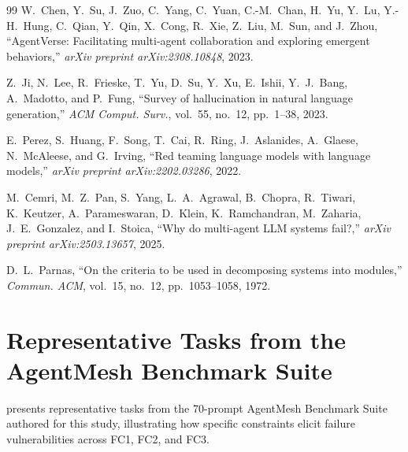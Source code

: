 \documentclass[conference]{IEEEtran}
\newcommand{\fc}[1]{\textsf{FC#1}}  %
\begin{document}
\begin{thebibliography}{99}
W.~Chen, Y.~Su, J.~Zuo, C.~Yang, C.~Yuan, C.-M.~Chan, H.~Yu, Y.~Lu, Y.-H.~Hung, C.~Qian, Y.~Qin, X.~Cong, R.~Xie, Z.~Liu, M.~Sun, and J.~Zhou, ``{AgentVerse}: Facilitating multi-agent collaboration and exploring emergent behaviors,'' \emph{arXiv preprint arXiv:2308.10848}, 2023.

Z.~Ji, N.~Lee, R.~Frieske, T.~Yu, D.~Su, Y.~Xu, E.~Ishii, Y.~J.~Bang, A.~Madotto, and P.~Fung, ``Survey of hallucination in natural language generation,'' \emph{ACM Comput. Surv.}, vol.~55, no.~12, pp.~1--38, 2023.

E.~Perez, S.~Huang, F.~Song, T.~Cai, R.~Ring, J.~Aslanides, A.~Glaese, N.~McAleese, and G.~Irving, ``Red teaming language models with language models,'' \emph{arXiv preprint arXiv:2202.03286}, 2022.

M.~Cemri, M.~Z.~Pan, S.~Yang, L.~A.~Agrawal, B.~Chopra, R.~Tiwari, K.~Keutzer, A.~Parameswaran, D.~Klein, K.~Ramchandran, M.~Zaharia, J.~E.~Gonzalez, and I.~Stoica, ``Why do multi-agent {LLM} systems fail?,'' \emph{arXiv preprint arXiv:2503.13657}, 2025.

D.~L.~Parnas, ``On the criteria to be used in decomposing systems into modules,'' \emph{Commun. ACM}, vol.~15, no.~12, pp.~1053--1058, 1972.

\end{thebibliography}

\appendix

\section{Representative Tasks from the AgentMesh Benchmark Suite}
\label{app:tasks}

 presents representative tasks from the 70-prompt AgentMesh Benchmark Suite authored for this study, illustrating how specific constraints elicit failure vulnerabilities across \fc{1}, \fc{2}, and \fc{3}.
\end{document}
